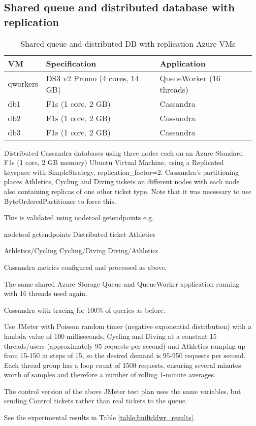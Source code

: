 %
%
\FloatBarrier
\subsection{Shared queue and distributed database with replication}


\begin{table}[h!]
	\begin{center}
		\caption{Shared queue and distributed DB with replication Azure VMs}
		\label{table:builtddwr_vmdesign}
		\begin{tabular}{l | l | l}
			VM		& Specification			& Application \\
			\hline
			qworkers	& DS3 v2 Promo (4 cores, 14 GB)	& QueueWorker (16 threads) \\
			db1		& F1s (1 core, 2 GB)		& Cassandra \\
			db2		& F1s (1 core, 2 GB)		& Cassandra \\
			db3		& F1s (1 core, 2 GB)		& Cassandra \\
		\end{tabular}
	\end{center}
\end{table}

\begin{shaded}
Distributed Cassandra databases using three nodes each on an Azure Standard F1s (1 core, 2 GB memory) Ubuntu Virtual Machine, using a Replicated keyspace with SimpleStrategy, replication\_factor=2.  Cassandra's partitioning places Athletics, Cycling and Diving tickets on different nodes with each node also containing replicas of one other ticket type.  Note that it was necessary to use ByteOrderedPartitioner to force this.

This is validated using nodetool getendpoints e.g.

nodetool getendpoints Distributed ticket Athletics

Athletics/Cycling
Cycling/Diving
Diving/Athletics

Cassandra metrics configured and processed as above.

The same shared Azure Storage Queue and QueueWorker application running with 16 threads used again.

Cassandra with tracing for 100\% of queries as before.

Use JMeter with Poisson random timer (negative exponential distribution) with a lambda value of 100 milliseconds, Cycling and Diving at a constant 15 threads/users (approximately 95 requests per second) and Athletics ramping up from 15-150 in steps of 15, so the desired demand is 95-950 requests per second.  Each thread group has a loop count of 1500 requests, ensuring several minutes worth of samples and therefore a number of rolling 1-minute averages.

The control version of the above JMeter test plan uses the same variables, but sending Control tickets rather than real tickets to the queue.

See the experimental results in Table \ref{table:builtddwr_results}.
\end{shaded}

